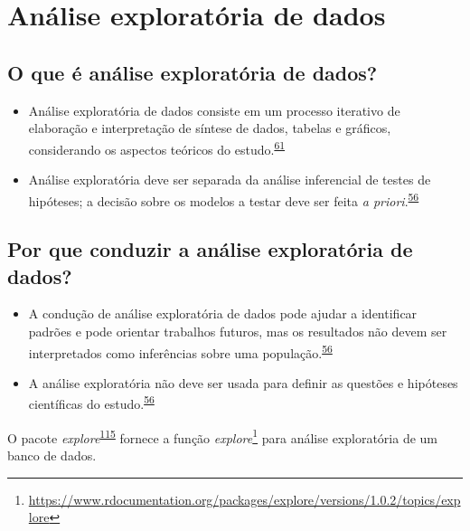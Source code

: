 \documentclass[
]{book}
\renewcommand{\href}[2]{#2\footnote{\url{#1}}}
\newenvironment{infobox}[1]
  {
  \begin{itemize}
  \renewcommand{\labelitemi}{
    \raisebox{-.7\height}[0pt][0pt]{
      {\setkeys{Gin}{width=3em,keepaspectratio}
        \texttt{[image: \#1]}}
    }
  }
  \setlength{\fboxsep}{1em}
  \begin{blackbox}
  \item
  }
  {
  \end{blackbox}
  \end{itemize}
  }
\begin{document}
\hypertarget{analise-exploratoria}{%
\section{Análise exploratória de dados}\label{analise-exploratoria}}

\hypertarget{o-que-uxe9-anuxe1lise-exploratuxf3ria-de-dados}{%
\subsection{O que é análise exploratória de dados?}\label{o-que-uxe9-anuxe1lise-exploratuxf3ria-de-dados}}

\begin{itemize}
\item
  Análise exploratória de dados consiste em um processo iterativo de elaboração e interpretação de síntese de dados, tabelas e gráficos, considerando os aspectos teóricos do estudo.\textsuperscript{\protect\hyperlink{ref-Ferketich1986}{61}}
\item
  Análise exploratória deve ser separada da análise inferencial de testes de hipóteses; a decisão sobre os modelos a testar deve ser feita \emph{a priori}.\textsuperscript{\protect\hyperlink{ref-zuur2009}{56}}
\end{itemize}

\hypertarget{por-que-conduzir-a-anuxe1lise-exploratuxf3ria-de-dados}{%
\subsection{Por que conduzir a análise exploratória de dados?}\label{por-que-conduzir-a-anuxe1lise-exploratuxf3ria-de-dados}}

\begin{itemize}
\item
  A condução de análise exploratória de dados pode ajudar a identificar padrões e pode orientar trabalhos futuros, mas os resultados não devem ser interpretados como inferências sobre uma população.\textsuperscript{\protect\hyperlink{ref-zuur2009}{56}}
\item
  A análise exploratória não deve ser usada para definir as questões e hipóteses científicas do estudo.\textsuperscript{\protect\hyperlink{ref-zuur2009}{56}}
\end{itemize}

\begin{infobox}{images/Rlogo}
O pacote \emph{explore}\textsuperscript{\protect\hyperlink{ref-explore}{115}} fornece a função \href{https://www.rdocumentation.org/packages/explore/versions/1.0.2/topics/explore}{\emph{explore}} para análise exploratória de um banco de dados.

\end{infobox}
\end{document}
